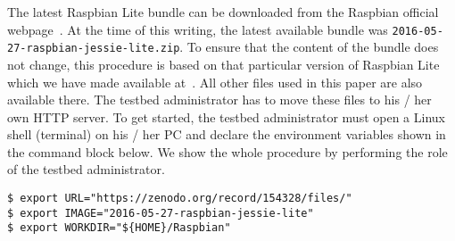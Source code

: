 
The latest Raspbian Lite bundle can be downloaded from the Raspbian
official webpage~\cite{raspbian}. At the time of this writing, the latest
available bundle was \texttt{2016-05-27-raspbian-jessie-lite.zip}.
To ensure that the content of the bundle does not change, this procedure
is based on that particular version of Raspbian Lite which we have
made available at~\cite{soerensen_chres_wiant_2016_154143}. All other files used in this paper are also available there. The testbed
administrator has to move these files to his / her own \ac{HTTP} server.
To get started, the testbed administrator must open a Linux
shell (terminal) on his / her \ac{PC} and declare the environment variables shown
in the command block below. We show the whole procedure by performing the role
of the testbed administrator.



\begin{lstlisting}[]
$ export URL="https://zenodo.org/record/154328/files/"
$ export IMAGE="2016-05-27-raspbian-jessie-lite"
$ export WORKDIR="${HOME}/Raspbian"
\end{lstlisting}
\FloatBarrier
\vspace{-5mm}


